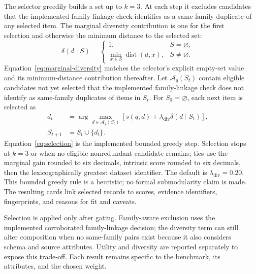 \documentclass[conference]{IEEEtran}
\begin{document}
The selector greedily builds a set up to $k=3$. At each step it excludes candidates that the implemented family-linkage check identifies as a same-family duplicate of any selected item. The marginal diversity contribution is one for the first selection and otherwise the minimum distance to the selected set:
\begin{equation}
\delta(d\mid S)=
\begin{cases}
1, & S=\varnothing,\\
\min_{x\in S}\operatorname{dist}(d,x), & S\neq\varnothing.
\end{cases}
\label{eq:marginal-diversity}
\end{equation}
Equation~\ref{eq:marginal-diversity} matches the selector's explicit empty-set value and its minimum-distance contribution thereafter. Let $\mathcal{A}_q(S_t)$ contain eligible candidates not yet selected that the implemented family-linkage check does not identify as same-family duplicates of items in $S_t$. For $S_0=\varnothing$, each next item is selected as
\begin{equation}
\begin{aligned}
d_t&=\arg\max_{d\in\mathcal{A}_q(S_t)}
\left[s(q,d)+\lambda_{\mathrm{div}}\delta(d\mid S_t)\right],\\
S_{t+1}&=S_t\cup\{d_t\}.
\end{aligned}
\label{eq:selection}
\end{equation}
Equation~\ref{eq:selection} is the implemented bounded greedy step. Selection stops at $k=3$ or when no eligible nonredundant candidate remains; ties use the marginal gain rounded to six decimals, intrinsic score rounded to six decimals, then the lexicographically greatest dataset identifier. The default is $\lambda_{\mathrm{div}}=0.20$. This bounded greedy rule is a heuristic; no formal submodularity claim is made. The resulting cards link selected records to scores, evidence identifiers, fingerprints, and reasons for fit and caveats.

Selection is applied only after gating. Family-aware exclusion uses the implemented corroborated family-linkage decision; the diversity term can still alter composition when no same-family pairs exist because it also considers schema and source attributes. Utility and diversity are reported separately to expose this trade-off. Each result remains specific to the benchmark, its attributes, and the chosen weight.
\end{document}
